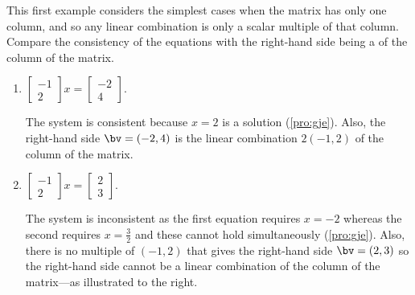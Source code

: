 \begin{example} 
This first example considers the simplest cases when the matrix has only one column, and so any linear combination is only a scalar multiple of that column.
Compare the consistency of the equations with the right-hand side being a  of the column of the matrix.
\begin{enumerate}
\item \(\begin{bmatrix} -1\\2 \end{bmatrix}x
=\begin{bmatrix} -2\\4 \end{bmatrix}\).
\begin{solution} 
The system is consistent because \(x=2\) is a solution (\cref{pro:gje}).
Also, the right-hand side \(\bv=(-2,4)\) is the linear combination \(2(-1,2)\) of the column of the matrix.
\end{solution}

\item 
\begin{figbox}{}%
\(\begin{bmatrix} -1\\2 \end{bmatrix}x
=\begin{bmatrix} 2\\3 \end{bmatrix}\).

\begin{solution} 
The system is inconsistent as the first equation requires \(x=-2\) whereas the second requires \(x=\tfrac32\) and these cannot hold simultaneously (\cref{pro:gje}).
Also, there is no multiple of \((-1,2)\) that gives the right-hand side \(\bv=(2,3)\) so the right-hand side cannot be a linear combination of the column of the matrix---as illustrated to the right.
\aqed

\end{solution}
\end{figbox}


\end{enumerate}
\end{example}
